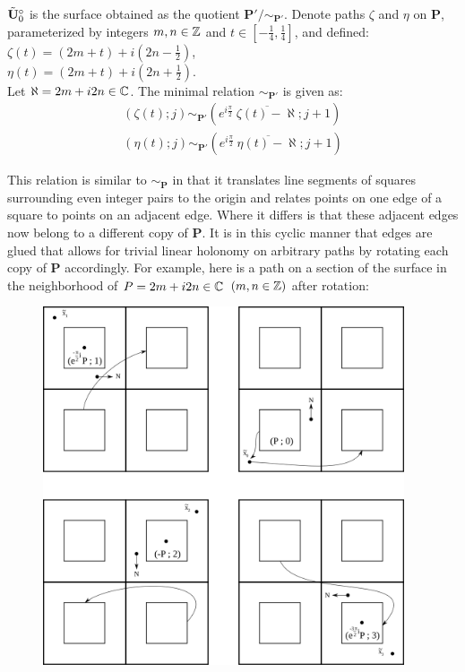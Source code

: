 \documentclass[]{article}
\def\btUos{\btU_0^\circ}
\begin{document}
\begin{Def}
$\btUos$ is the surface obtained as the quotient $\mathbf{P}'/\sim_{\mathbf{P}'}$. Denote paths $\zeta$ and $\eta$  on $\mathbf{P}$, parameterized by integers $m,n\in\mathbb{Z}$ and $t\in[-\frac{1}{4},\frac{1}{4}]$, and defined:\\ $\zeta(t)=(2m+t)+i(2n-\frac{1}{2})$,\\
$\eta(t)=(2m+t)+i(2n+\frac{1}{2})$.\\ Let $\aleph=2m+i2n\in\mathbb{C}$. The minimal relation $\sim_{\mathbf{P}'}$ is given as:
\begin{equation}
\begin{split}
(\zeta(t);j)\sim_{\mathbf{P'}}(e^{i\frac{\pi}{2}}~\overline{\zeta(t)-\aleph};j+1)\\
(\eta(t);j)\sim_{\mathbf{P'}}(e^{i\frac{\pi}{2}}~\overline{\eta(t)-\aleph};j+1)
\label{eq:rel2}
\end{split}
\end{equation}
\end{Def}
This relation is similar to $\sim_\mathbf{P}$ in that it translates line segments of squares surrounding even integer pairs to the origin and relates points on one edge of a square to points on an adjacent edge. Where it differs is that these adjacent edges now belong to a different copy of $\mathbf{P}$. It is in this cyclic manner that edges are glued that allows for trivial linear holonomy on arbitrary paths by rotating each copy of $\mathbf{P}$ accordingly. For example, here is a path on a section of the surface in the neighborhood of $P=2m+i2n\in\mathbb{C}$ $(m,n\in\mathbb{Z})$ after rotation:

\begin{figure}[H]
\centering
\includegraphics[width=4.2in]{coverdirection.png}
\end{figure}
\end{document}
